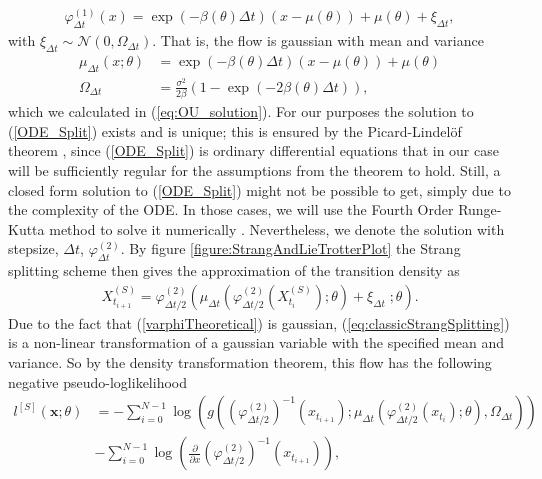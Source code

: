 \begin{align}
    \varphi_{\Delta t}^{(1)}(x) = \exp\left(-\beta\left(\theta\right) \Delta t\right)\left(x - \mu\left(\theta\right)\right) + \mu\left(\theta\right) + \xi_{\Delta t}, \label{varphiTheoretical}
\end{align}
with $\xi_{\Delta t}\sim\mathcal{N}\left(0, \Omega_{\Delta t}\right)$. That is, the flow is gaussian with mean and variance
\begin{align}
    \mu_{\Delta t}(x; \theta) &= \exp\left(-\beta\left(\theta\right) \Delta t\right)\left(x - \mu\left(\theta\right)\right) + \mu\left(\theta\right) \label{linearSDEMean}\\
    \Omega_{\Delta t} &= \frac{\sigma^2}{2\beta}\left(1 - \exp\left(-2\beta\left(\theta\right)\Delta t\right)\right), \label{linearSDEVariance}
\end{align}
which we calculated in (\ref{eq:OU_solution}). For our purposes the solution to (\ref{ODE_Split}) exists and is unique; this is ensured by the Picard-Lindelöf theorem \cite[section 2.7]{Srkk2019}, since (\ref{ODE_Split}) is ordinary differential equations that in our case will be sufficiently regular for the assumptions from the theorem to hold. Still, a closed form solution to (\ref{ODE_Split}) might not be possible to get, simply due to the complexity of the ODE. In those cases, we will use the Fourth Order Runge-Kutta method to solve it numerically \cite[p.541 equation (8)]{numericalAnalysis}.  
Nevertheless, we denote the solution with stepsize, $\Delta t$, $\varphi_{\Delta t}^{(2)}$. By figure \ref{figure:StrangAndLieTrotterPlot} the Strang splitting scheme then gives the approximation of the transition density as 
\begin{align}
    X_{t_{i+1}}^{(S)} = \varphi_{\Delta t / 2}^{(2)}\left(\mu_{\Delta t}\left(\varphi_{\Delta t/2}^{(2)}\left(X_{t_{i}}^{(S)}\right); \theta\right) + \xi_{\Delta t} \; ; \theta \right). \label{eq:classicStrangSplitting}
\end{align}
Due to the fact that (\ref{varphiTheoretical}) is gaussian, (\ref{eq:classicStrangSplitting}) is a non-linear transformation of a gaussian variable with the specified mean and variance. So by the density transformation theorem, this flow has the following negative pseudo-loglikelihood 
\begin{align}
    l^{[S]}(\mathbf{x}; \theta) &= -\sum_{i = 0}^{N - 1}\log\left(g\left(\left(\varphi_{\Delta t / 2}^{(2)}\right)^{-1}\left(x_{t_{i+1}}\right); \mu_{\Delta t}\left(\varphi_{\Delta t/2}^{(2)}\left(x_{t_{i}}\right); \theta \right), \Omega_{\Delta t} \right) \right) \nonumber \\
    &- \sum_{i = 0}^{N - 1}\log\left(\frac{\partial}{\partial x}\left(\varphi_{\Delta t / 2}^{(2)}\right)^{-1}\left(x_{t_{i + 1}}\right) \right), \label{eq:Strang_likelihood}
\end{align}
